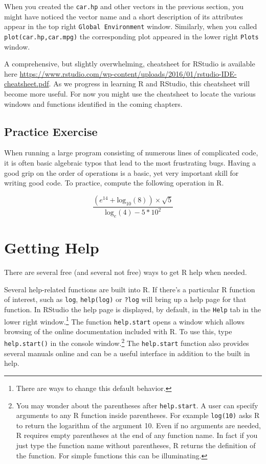 \documentclass[]{krantz}
\begin{document}
When you created the \texttt{car.hp} and other vectors in the previous
section, you might have noticed the vector name and a short description
of its attributes appear in the top right \texttt{Global\ Environment}
window. Similarly, when you called \texttt{plot(car.hp,car.mpg)} the
corresponding plot appeared in the lower right \texttt{Plots} window.

A comprehensive, but slightly overwhelming, cheatsheet for RStudio is
available here
\url{https://www.rstudio.com/wp-content/uploads/2016/01/rstudio-IDE-cheatsheet.pdf}.
As we progress in learning R and RStudio, this cheatsheet will become
more useful. For now you might use the cheatsheet to locate the various
windows and functions identified in the coming chapters.

\subsection{Practice Exercise}\label{practice-exercise}

When running a large program consisting of numerous lines of complicated
code, it is often basic algebraic typos that lead to the most
frustrating bugs. Having a good grip on the order of operations is a
basic, yet very important skill for writing good code. To practice,
compute the following operation in R.

\[
\frac{(e^{14} + \text{log}_{10}(8)) \times \sqrt{5}}{\text{log}_{e}(4) - 5 * 10^2}
\]

\section{Getting Help}\label{getting-help}

There are several free (and several not free) ways to get R help when
needed.

Several help-related functions are built into R. If there's a particular
R function of interest, such as \texttt{log}, \texttt{help(log)} or
\texttt{?log} will bring up a help page for that function. In RStudio
the help page is displayed, by default, in the \texttt{Help} tab in the
lower right window.\footnote{There are ways to change this default
  behavior.} The function \texttt{help.start} opens a window which
allows browsing of the online documentation included with R. To use
this, type \texttt{help.start()} in the console window.\footnote{You may
  wonder about the parentheses after \texttt{help.start}. A user can
  specify arguments to any R function inside parentheses. For example
  \texttt{log(10)} asks R to return the logarithm of the argument 10.
  Even if no arguments are needed, R requires empty parentheses at the
  end of any function name. In fact if you just type the function name
  without parentheses, R returns the definition of the function. For
  simple functions this can be illuminating.} The \texttt{help.start}
function also provides several manuals online and can be a useful
interface in addition to the built in help.
\end{document}
